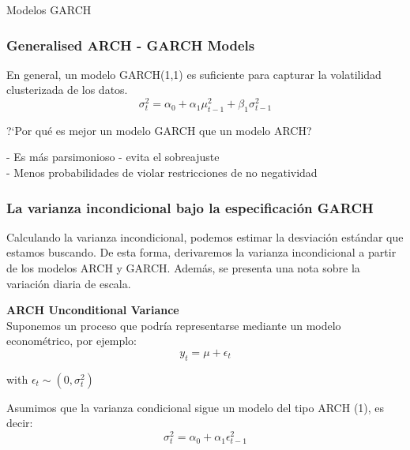 \documentclass[xcolor=(list of options)]{beamer}
\begin{document}
\begin{section}{Modelos GARCH}
\begin{frame}
\end{frame}

\begin{frame}
\frametitle{Generalised ARCH - GARCH Models}

En general, un modelo GARCH(1,1)  es suficiente para capturar la volatilidad clusterizada de los datos.\\
\begin{equation}
\sigma_{t}^{2}=\alpha_{0}+\alpha_{1}\mu_{t-1}^{2}+\beta_{1}\sigma_{t-1}^{2}
\end{equation}

\vspace{2mm}	

?`Por qu\'e es mejor un modelo GARCH que un modelo ARCH?\\
\vspace{2mm}	

- Es m\'as parsimonioso - evita el sobreajuste\\
- Menos probabilidades de violar restricciones de no negatividad


\end{frame}

\begin{frame}
\frametitle{La varianza incondicional bajo la especificación GARCH}

Calculando la varianza incondicional, podemos estimar la desviaci\'on est\'andar que estamos buscando. De esta forma, derivaremos la varianza incondicional a partir de los modelos ARCH y GARCH. Adem\'as, se presenta una nota sobre la variación diaria de escala.\\
\vspace{2mm}	

\textbf{ARCH Unconditional Variance}\\

Suponemos un proceso que podr\'{i}a representarse mediante un modelo econom\'etrico, por ejemplo:\\
\begin{equation}
y_{t}=\mu+\epsilon_{t}
\end{equation}


with $\epsilon_{t}\sim\left(0,\sigma_{t}^{2}\right)$

Asumimos que la varianza condicional sigue un modelo del tipo ARCH (1), es decir:\\
\begin{equation}
\sigma_{t}^{2}=\alpha_{0}+\alpha_{1}\epsilon_{t-1}^{2}
\end{equation}


\end{frame}
\end{section}
\end{document}
